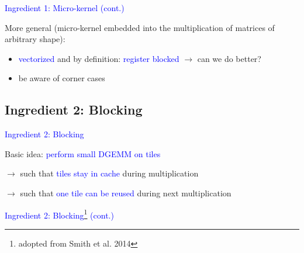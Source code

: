 \documentclass[11pt]{beamer}
\begin{document}
\begin{frame}{\textcolor{blue}{Ingredient 1: Micro-kernel (cont.)}}

More general (micro-kernel embedded into the multiplication of matrices of arbitrary shape):

\begin{small}
\begin{figure}
    \centering
    \def\svgwidth{0.95\columnwidth}
    
\end{figure}
\end{small}

\begin{itemize}
\item \textcolor{blue}{vectorized} and by definition: \textcolor{blue}{register blocked}
  $\rightarrow$   can we do better?
\item be aware of corner cases
\end{itemize}

\end{frame}


\subsection{Ingredient 2: Blocking}

\begin{frame}{\textcolor{blue}{Ingredient 2: Blocking}}

Basic idea: \textcolor{blue}{perform small DGEMM on tiles}

\vspace{0.5cm}

\begin{small}
\begin{figure}
    \centering
    \def\svgwidth{0.7\columnwidth}
    
\end{figure}
\end{small}

\qquad\qquad$\rightarrow$ such that \textcolor{blue}{tiles stay in cache} during multiplication

\qquad\qquad$\rightarrow$ such that \textcolor{blue}{one tile can be reused} during next multiplication

\end{frame}


\begin{frame}{\textcolor{blue}{Ingredient 2: Blocking\footnote{adopted from Smith et al. 2014} (cont.)}}
\begin{small}
\begin{figure}
    \centering
    \def\svgwidth{0.9\columnwidth}
    
\end{figure}
\end{small}

\end{frame}
\end{document}

